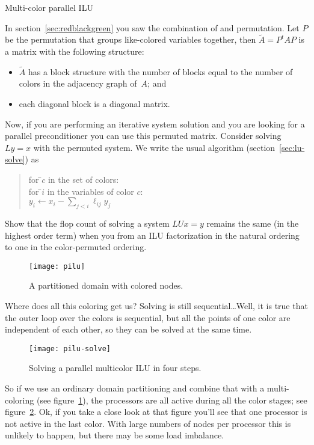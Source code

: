  {Multi-color parallel ILU}
\label{sec:jones-plassman}

In section~\ref{sec:redblackgreen} you saw the combination of
 and permutation. Let $P$ be the
permutation that groups like-colored variables together, then $\tilde
A=P^tAP$ is a matrix with the following structure:
\begin{itemize}
\item $\tilde A$ has a block structure with the number of blocks equal
  to the number of colors in the adjacency graph of~$A$; and
\item each diagonal block is a diagonal matrix.
\end{itemize}
Now, if you are performing an iterative system solution
and you are looking for a parallel preconditioner you can use this
permuted matrix. Consider solving $Ly=x$ with the permuted system. We
write the usual algorithm (section~\ref{sec:lu-solve}) as
\begin{quotation}
  \begin{tabbing}
    for \=$c$ in the set of colors:\\
    \>for \=$i$ in the variables of color $c$:\\
    \>\>$y_i\leftarrow x_i-\sum_{j<i} \ell_{ij}y_j$
  \end{tabbing}
\end{quotation}

\begin{exercise}
  Show that the flop count of solving a system $LUx=y$ remains the
  same (in the highest order term) when you from an \ac{ILU}
  factorization in the natural ordering to one in the color-permuted
  ordering.
\end{exercise}

\begin{figure}
  \texttt{[image: pilu]}
  \caption{A partitioned domain with colored nodes.}
  \label{fig:pilu}
\end{figure}
Where does all this coloring get us? Solving is still
sequential\ldots Well, it is true that the outer loop over the colors
is sequential, but all the points of one color are independent of
each other, so they can be solved at the same time.
\begin{figure}
  \texttt{[image: pilu-solve]}
  \caption{Solving a parallel multicolor ILU in four steps.}
  \label{fig:pilu-solve}
\end{figure}
So if we use an ordinary domain partitioning and combine that with a
multi-coloring (see figure~\ref{fig:pilu}), the processors are all
active during all the color stages; see
figure~\ref{fig:pilu-solve}. Ok, if you take a close look at that
figure you'll see that one processor is not active in the last
color. With large numbers of nodes per processor this is unlikely to
happen, but there may be some load imbalance.

